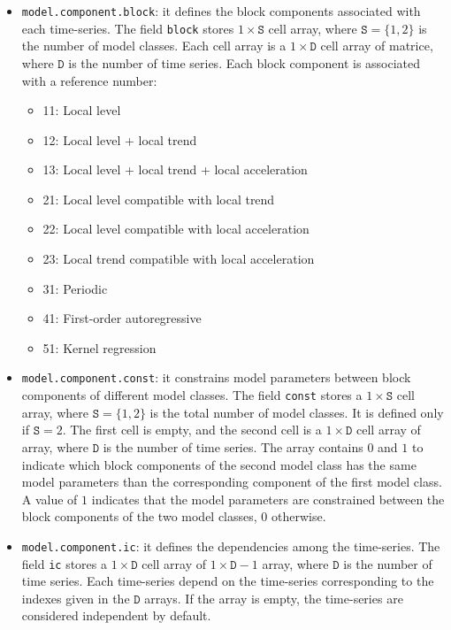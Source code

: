 \begin{itemize}

\item \lstinline[basicstyle = \mlttfamily \small ]!model.component.block!: it defines the block components associated with each time-series.
The field \lstinline[basicstyle = \mlttfamily \small ]!block! stores $1\times \mathtt{S}$ cell array, where $\mathtt{S} = \{1,2 \}$ is the number of model classes.
Each cell array is a $1\times \mathtt{D}$ cell array of matrice, where $\mathtt{D}$ is the number of time series.
Each block component is associated with a reference number:
\begin{itemize}
\item 11: Local level 
\item 12: Local level + local trend
\item 13: Local level + local trend + local acceleration
\item 21: Local level compatible with local trend
\item 22: Local level compatible with local acceleration
\item 23: Local trend compatible with local acceleration
\item 31: Periodic
\item 41: First-order autoregressive
\item 51: Kernel regression
\end{itemize}

\item  \lstinline[basicstyle = \mlttfamily \small ]!model.component.const!: it constrains model parameters between block components of different model classes.
The field \lstinline[basicstyle = \mlttfamily \small ]!const! stores a $1\times \mathtt{S}$ cell array, where $\mathtt{S} = \{1, 2 \}$ is the total number of model classes.
It is defined only if $\mathtt{S} = 2$.
The first cell is empty, and the second cell is a $1\times \mathtt{D}$ cell array of array, where $\mathtt{D}$ is the number of time series.
The array contains $0$ and $1$ to indicate which block components of the second model class has the same model parameters than the corresponding component of the first model class. 
A value of $1$ indicates that the model parameters are constrained between the block components of the two model classes, $0$ otherwise.

\item  \lstinline[basicstyle = \mlttfamily \small ]!model.component.ic!:  it defines the dependencies among the time-series.
The field \lstinline[basicstyle = \mlttfamily \small ]!ic! stores a $1\times \mathtt{D}$ cell array of $1\times \mathtt{D}-1$ array, where $\mathtt{D}$ is the number of time series.
Each time-series depend on the time-series corresponding to the indexes given in the $\mathtt{D}$ arrays.
If the array is empty, the time-series are considered independent by default.

\end{itemize}


